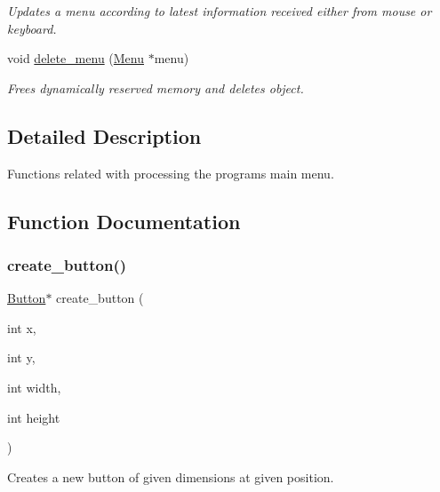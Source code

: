 \begin{DoxyCompactItemize}
\begin{DoxyCompactList}\small\item\em Updates a menu according to latest information received either from mouse or keyboard. \end{DoxyCompactList}\item 
void \hyperlink{group__menu_gacd664c37e26bab0e115dc3e1e3d3f3e2}{delete\+\_\+menu} (\hyperlink{struct_menu}{Menu} $\ast$menu)
\begin{DoxyCompactList}\small\item\em Frees dynamically reserved memory and deletes \textquotesingle{}object\textquotesingle{}. \end{DoxyCompactList}\end{DoxyCompactItemize}


\subsection{Detailed Description}
Functions related with processing the program\textquotesingle{}s main menu. 



\subsection{Function Documentation}
\hypertarget{group__menu_gaac1aca3c5e3ed5bccc82ccd7556138ed}{}\label{group__menu_gaac1aca3c5e3ed5bccc82ccd7556138ed} 
\subsubsection{\texorpdfstring{create\+\_\+button()}{create\_button()}}
{\footnotesize\ttfamily \hyperlink{struct_button}{Button}$\ast$ create\+\_\+button (\begin{DoxyParamCaption}\item[{int}]{x,  }\item[{int}]{y,  }\item[{int}]{width,  }\item[{int}]{height }\end{DoxyParamCaption})}



Creates a new button of given dimensions at given position. 


